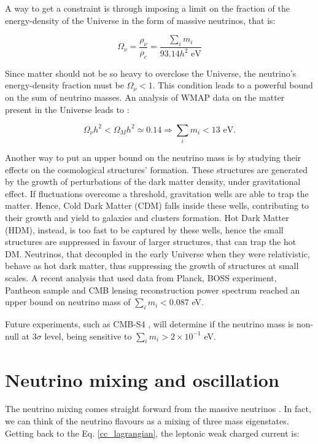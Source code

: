 A way to get a constraint is through imposing a limit on the fraction of the energy-density of the Universe in the form of massive neutrinos, that is:

\begin{equation}
\label{en-dens}
    \Omega_\nu = \frac{\rho_\nu}{\rho_c} = \frac{\sum_i m_i}{93.14 h^2 \text{ eV}} 
\end{equation}

Since matter should not be so heavy to overclose the Universe, the neutrino's energy-density fraction must be $\Omega_\nu < 1$. This condition leads to a powerful bound on the sum of neutrino masses. An analysis of WMAP data on the matter present in the Universe leads to \cite{giunti_kim_fundamental}: 

\begin{equation}
    \Omega_\nu h^2 < \Omega_M h^2 \simeq 0.14 \Longrightarrow \sum_i m_i < 13\text{ eV}.
\end{equation}

Another way to put an upper bound on the neutrino mass is by studying their effects on the cosmological structures' formation. These structures are generated by the growth of perturbations of the dark matter density, under gravitational effect. If fluctuations overcome a threshold, gravitation wells are able to trap the matter. Hence, Cold Dark Matter (CDM) falls inside these wells, contributing to their growth and yield to galaxies and clusters formation. Hot Dark Matter (HDM), instead, is too fast to be captured by these wells, hence the small structures are suppressed in favour of larger structures, that can trap the hot DM. Neutrinos, that decoupled in the early Universe when they were relativistic, behave as hot dark matter, thus suppressing the growth of structures at small scales. 
A recent analysis that used data from Planck, BOSS experiment, Pantheon sample and CMB lensing reconstruction power spectrum \cite{cosmology-nu} reached an upper bound on neutrino mass of $\sum_i m_i < 0.087$ eV.

Future experiments, such as CMB-S4 \cite{future-CMB}, will determine if the neutrino mass is non-null at $3\sigma$ level, being sensitive to $\sum_i m_i > 2 \times 10^{-1}$ eV.



\section{Neutrino mixing and oscillation}
\label{neutrino-mixing}
The neutrino mixing comes straight forward from the massive neutrinos \cite{giunti_kim_fundamental}. In fact, we can think of the neutrino flavours as a mixing of three mass eigenstates. Getting back to the Eq. \ref{cc_lagrangian}, the leptonic weak charged current is: 

